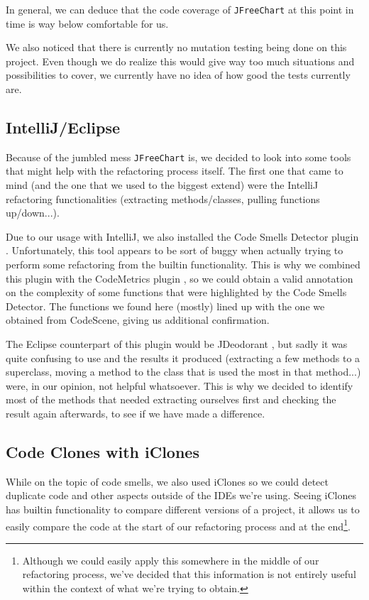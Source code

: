 \documentclass[11pt]{article}
\begin{document}
	In general, we can deduce that the code coverage of \texttt{JFreeChart} at this point in time is way below comfortable for us.
	
	We also noticed that there is currently no mutation testing being done on this project. Even though we do realize this would give way too much situations and possibilities to cover, we currently have no idea of how good the tests currently are.
	
	\subsection{IntelliJ/Eclipse}
	Because of the jumbled mess \texttt{JFreeChart} is, we decided to look into some tools that might help with the refactoring process itself. The first one that came to mind (and the one that we used to the biggest extend) were the \textsf{IntelliJ} refactoring functionalities (extracting methods/classes, pulling functions up/down...).
	
	Due to our usage with \textsf{IntelliJ}, we also installed the \textsf{Code Smells Detector} plugin \cite{jetbrains-csd}. Unfortunately, this tool appears to be sort of buggy when actually trying to perform some refactoring from the builtin functionality. This is why we combined this plugin with the \textsf{CodeMetrics} plugin \cite{jetbrains-cm}, so we could obtain a valid annotation on the complexity of some functions that were highlighted by the \textsf{Code Smells Detector}. The functions we found here (mostly) lined up with the one we obtained from \textsf{CodeScene}, giving us additional confirmation.
	
	The \textsf{Eclipse} counterpart of this plugin would be \textsf{JDeodorant} \cite{jdeodorant}, but sadly it was quite confusing to use and the results it produced (extracting a few methods to a superclass, moving a method to the class that is used the most in that method...) were, in our opinion, not helpful whatsoever. This is why we decided to identify most of the methods that needed extracting ourselves first and checking the result again afterwards, to see if we have made a difference.
	
	\subsection{Code Clones with iClones}
	While on the topic of code smells, we also used \textsf{iClones} so we could detect duplicate code and other aspects outside of the IDEs we're using. Seeing \textsf{iClones} has builtin functionality to compare different versions of a project, it allows us to easily compare the code at the start of our refactoring process and at the end\footnote{Although we could easily apply this somewhere in the middle of our refactoring process, we've decided that this information is not entirely useful within the context of what we're trying to obtain.}.
	
\end{document}
